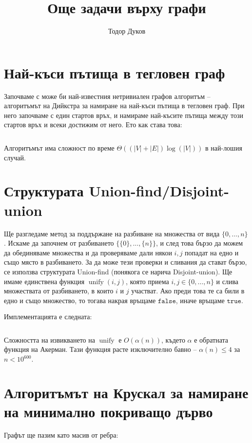 \documentclass{article}
\title{Още задачи върху графи}
\author{Тодор Дуков}
\date{}
\theoremstyle{definition}
\theoremstyle{plain}
\theoremstyle{remark}
\theoremstyle{definition}
\begin{document}
\maketitle

\section*{Най-къси пътища в тегловен граф}

Започваме с може би най-известния нетривиален графов алгоритъм -- алгоритъмът на Дийкстра за намиране на най-къси пътища в тегловен граф.
При него започваме с един стартов връх, и намираме най-късите пътища между този стартов връх и всеки достижим от него.
Ето как става това:
\inputminted[linenos]{c++}{algorithms/dijkstra.cpp}
Алгоритъмът има сложност по време $\Theta((|V| + |E|)\log(|V|))$ в най-лошия случай.

\section*{Структурата Union-find/Disjoint-union}

Ще разгледаме метод за поддържане на разбиване на множества от вида $\{ 0, \dots, n \}$.
Искаме да започнем от разбиването $\{ \{ 0 \}, \dots, \{ n \} \}$, и след това бързо да можем да обединяваме множества и да проверяваме дали някои $i, j$ попадат на едно и също място в разбиването.
За да може тези проверки и сливания да стават бързо, се използва структурата Union-find (понякога се нарича Disjoint-union).
Ще имаме единствена функция $\operatorname{unify}(i, j)$, която приема $i, j \in \{ 0, \dots, n \}$ и слива множествата от разбиването, в които $i$ и $j$ участват.
Ако преди това те са били в едно и също множество, то тогава накрая връщаме $\mathtt{false}$, иначе връщаме $\mathtt{true}$.

\pagebreak

Имплементацията е следната:
\inputminted[linenos]{c++}{structures/union_find.hpp}
Сложността на извикването на $\operatorname{unify}$ е $O(\alpha(n))$, където $\alpha$ е обратната функция на Акерман.
Тази функция расте изключително бавно -- $\alpha(n) \leq 4$ за $n < 10^{600}$.

\section*{Алгоритъмът на Крускал за намиране на минимално покриващо дърво}
Графът ще пазим като масив от ребра:
\inputminted[linenos]{c++}{structures/edge.hpp}
\end{document}

